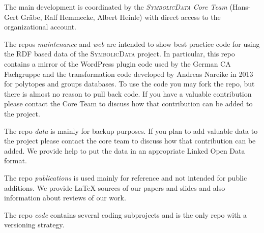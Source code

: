 \documentclass[a4paper,11pt]{article}
\def\SD{\textsc{SymbolicData}}
\begin{document}
The main development is coordinated by the \emph{{\SD} Core Team} (Hans-Gert
Gr\"abe, Ralf Hemmecke, Albert Heinle) with direct access to the organizational
account.

The repos \emph{maintenance} and \emph{web} are intended to show best practice
code for using the RDF based data of the {\SD} project.  In particular, this
repo contains a mirror of the WordPress plugin code used by the German CA
Fachgruppe and the transformation code developed by Andreas Nareike in 2013 for
polytopes and groups databases.  To use the code you may fork the repo, but
there is almost no reason to pull back code. If you have a valuable
contribution please contact the Core Team to discuss how that contribution can
be added to the project.

The repo \emph{data} is mainly for backup purposes. If you plan to add valuable
data to the project please contact the core team to discuss how that
contribution can be added. We provide help to put the data in an appropriate
Linked Open Data format.

The repo \emph{publications} is used mainly for reference and not intended for
public additions. We provide {\LaTeX} sources of our papers and slides and also
information about reviews of our work.

The repo \emph{code} contains several coding subprojects and is the only repo
with a versioning strategy.
\end{document}
